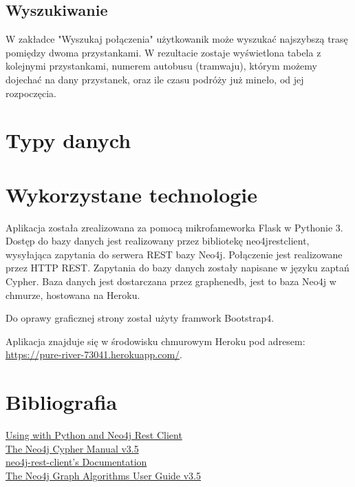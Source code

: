 \documentclass[12pt]{article}
\begin{document}
\subsection{Wyszukiwanie}
W zakładce "Wyszukaj połączenia" użytkowanik może wyszukać najszybszą trasę pomiędzy dwoma przystankami. W rezultacie zostaje wyświetlona tabela z kolejnymi przystankami, numerem autobusu (tramwaju), którym możemy dojechać na dany przystanek, oraz ile czasu podróży już mineło, od jej rozpoczęcia.

\section{Typy danych}

\section{Wykorzystane technologie}
Aplikacja została zrealizowana za pomocą mikrofameworka Flask w Pythonie 3. Dostęp do bazy danych jest realizowany przez bibliotekę neo4jrestclient, wysyłająca zapytania do serwera REST bazy Neo4j. Połączenie jest realizowane przez HTTP REST. Zapytania do bazy danych zostały napisane w języku zaptań Cypher. Baza danych jest dostarczana przez graphenedb, jest to baza Neo4j w chmurze, hostowana na Heroku.

Do oprawy graficznej strony został użyty framwork Bootstrap4.

Aplikacja znajduje się w środowisku chmurowym Heroku pod adresem:
\url{https://pure-river-73041.herokuapp.com/}.


\section{Bibliografia}
\href{https://devcenter.heroku.com/articles/graphenedb#using-with-python-and-neo4j-rest-client}{Using with Python and Neo4j Rest Client}
\\
\href{https://neo4j.com/docs/cypher-manual/current/}{The Neo4j Cypher Manual v3.5}
\\
\href{https://neo4j-rest-client.readthedocs.io/en/latest/info.html}{neo4j-rest-client’s Documentation}
\\
\href{https://neo4j.com/docs/graph-algorithms/current/}{The Neo4j Graph Algorithms User Guide v3.5}
\end{document}
